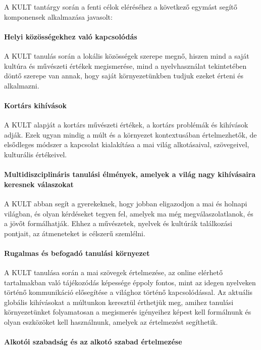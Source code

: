 A KULT tantárgy során a fenti célok eléréséhez a következő egymást segítő
komponensek alkalmazása javasolt:

\paragraph{Helyi közösségekhez való kapcsolódás}

A KULT tanulás során a lokális közösségek szerepe megnő, hiszen mind a saját
kultúra és művészeti értékek megismerése, mind a nyelvhasználat tekintetében
döntő szerepe van annak, hogy saját környezetünkben  tudjuk ezeket érteni és
alkalmazni.

\paragraph{Kortárs kihívások}

A KULT alapját a kortárs művészeti értékek, a kortárs problémák és kihívások
adják. Ezek ugyan mindig a múlt és a környezet kontextusában értelmezhetők, de
elsődleges módszer a kapcsolat kialakítása a mai világ alkotásaival,
szövegeivel, kulturális értékeivel.

\paragraph{Multidiszciplináris tanulási élmények, amelyek a világ nagy
  kihívásaira keresnek válaszokat}

A KULT abban segít a gyerekeknek, hogy jobban eligazodjon a mai és holnapi
világban, és olyan kérdéseket tegyen fel, amelyek ma még megválaszolatlanok, és
a jövőt formálhatják. Ehhez a művészetek, nyelvek és kultúrák találkozási
pontjait, az átmeneteket is célszerű szemlélni.

\paragraph{Rugalmas és befogadó tanulási környezet}

A KULT tanulása során a mai szövegek értelmezése, az online elérhető
tartalmakban való tájékozódás képessége éppoly fontos, mint az idegen nyelveken
történő kommunikáció elősegítése a világhoz történő kapcsolódással. Az aktuális
globális kihívásokat a múltunkon keresztül érthetjük meg, amihez tanulási
környezetünket folyamatosan a megismerés igényeihez képest kell formálnunk és
olyan eszközöket kell használnunk, amelyek az értelmezést segíthetik.

\paragraph{Alkotói szabadság és az alkotó szabad értelmezése}


